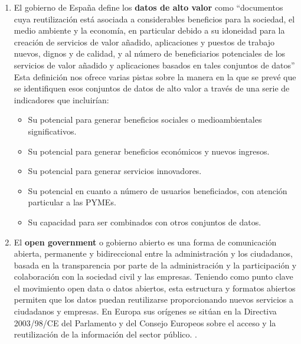 \begin{enumerate}
	\item El gobierno de España define los \textbf{datos de alto valor} \label{def1}  como “documentos cuya reutilización está asociada a considerables beneficios para la sociedad, el medio ambiente y la economía, en particular debido a su idoneidad para la creación de servicios de valor añadido, aplicaciones y puestos de trabajo nuevos, dignos y de calidad, y al número de beneficiarios potenciales de los servicios de valor añadido y aplicaciones basados en tales conjuntos de datos” Esta definición nos ofrece varias pistas sobre la manera en la que se prevé que se identifiquen esos conjuntos de datos de alto valor a través de una serie de indicadores que incluirían:
		\begin{itemize}
			\item Su potencial para generar beneficios sociales o medioambientales significativos.
			
			\item Su potencial para generar beneficios económicos y nuevos ingresos.
			
			\item Su potencial para generar servicios innovadores.
			
			\item Su potencial en cuanto a número de usuarios beneficiados, con atención particular a las PYMEs.
			
			\item Su capacidad para ser combinados con otros conjuntos de datos. \\
		\end{itemize}
		
	\item El \textbf{open government} \label{def2} o gobierno abierto es una forma de comunicación abierta, permanente y bidireccional entre la administración y los ciudadanos, basada en la transparencia por parte de la administración y la participación y colaboración con la sociedad civil y las empresas. Teniendo como punto clave el movimiento open data o datos abiertos, esta estructura y formatos abiertos permiten que los datos puedan reutilizarse proporcionando nuevos servicios a ciudadanos y empresas. En Europa sus orígenes se sitúan en la Directiva 2003/98/CE del Parlamento y del Consejo Europeos sobre el acceso y la reutilización de la información del sector público. \citep{OperGovernment2011}. \\
	

\end{enumerate}
